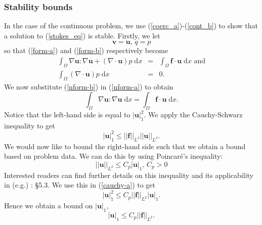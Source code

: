\documentclass[12pt,a4paper]{article}
\theoremstyle{definition}
\begin{document}
\subsubsection{Stability bounds}
In the case of the continuous problem, we use (\ref{coerc_a})-(\ref{cont_b}) to show that a solution to (\ref{stokes_eq}) is stable. Firstly, we let 
\begin{equation}
	\textbf{v}=\textbf{u},\, q =p
\end{equation}
so that (\ref{form-a}) and (\ref{form-b}) respectively become
\begin{eqnarray}\label{nform-a}
\int_{\Omega}\nabla \textbf{u} : \nabla \textbf{u}+\left(\nabla \cdot \textbf{u}\right)p\;\mathrm{d}x  &=&\int_{\Omega}\textbf{f}\cdot \textbf{u} \;\mathrm{d}x
 \text{ and} \\\label{nform-b}
\int_{\Omega}\left(\nabla \cdot \textbf{u}\right)p\;\mathrm{d}x&=& 0.
\end{eqnarray}
We now substitute (\ref{nform-b}) in (\ref{nform-a}) to obtain
\begin{equation}
\int_{\Omega}\nabla \textbf{u} : \nabla \textbf{u}\;\mathrm{d}x  =\int_{\Omega}\textbf{f}\cdot \textbf{u} \;\mathrm{d}x.
\end{equation}
Notice that the left-hand side is equal to $\left|\textbf{u}\right|_1^2$.  We apply the Cauchy-Schwarz inequality to get
\begin{equation}\label{cauchy-a}
\left|\textbf{u}\right|_1^2\leq\left|\left|\textbf{f}\right|\right|_{L^2}\left|\left|\textbf{u}\right|\right|_{L^2}.
\end{equation}
We would now like to bound the right-hand side such that we obtain a bound based on problem data.  We can do this by using Poincar\'e's inequality:
\begin{equation} 
\left|\left|\textbf{u}\right|\right|_{L^2}\leq C_p\left|\textbf{u}\right|_1\text{, } C_p>0
\end{equation}
Interested readers can find further details on this inequality and its applicability  in (e.g.) \cite{brenner2007mathematical}: \S 5.3.  We use this in (\ref{cauchy-a}) to get
\begin{equation}\label{cauchy-b}
\left|\textbf{u}\right|_1^2\leq C_p\left|\left|\textbf{f}\right|\right|_{L^2} \left|\textbf{u}\right|_1.
\end{equation}
Hence we obtain a bound on $\left|\textbf{u}\right|_1$, 
\begin{equation}\label{bound-u-cont}
\left|\textbf{u}\right|_1\leq C_p\left|\left|\textbf{f}\right|\right|_{L^2}.
\end{equation}
\end{document}
